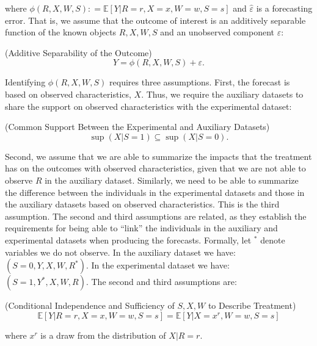\noindent where $\phi \left( R, X, W, S \right) : = \mathbb{E} \left[ Y | R = r, X = x, W = w, S = s \right] $ and $\widehat{\varepsilon}$ is a forecasting error. That is, we assume that the outcome of interest is an additively separable function of the known objects $R, X, W, S$ and an unobserved component $\varepsilon$: 

\begin{assumption} (Additive Separability of the Outcome) \label{ass:additive}
\begin{equation}
Y = \phi \left( R, X, W, S \right) + \varepsilon. 
\end{equation}
\end{assumption}

\noindent Identifying $\phi \left( R, X, W, S \right)$ requires three assumptions. First, the forecast is based on observed characteristics, $X$. Thus, we require the auxiliary datasets to share the support on observed characteristics with the experimental dataset: 

\begin{assumption} \label{ass:support} (Common Support Between the Experimental and Auxiliary Datasets)
\begin{equation}
\sup \left( X | S = 1 \right) \subseteq \sup \left( X | S = 0 \right).
\end{equation}
\end{assumption}

\noindent Second, we assume that we are able to summarize the impacts that the treatment has on the outcomes with observed characteristics, given that we are not able to observe $R$ in the auxiliary dataset. Similarly, we need to be able to summarize the difference between the individuals in the experimental datasets and those in the auxiliary datasets based on observed characteristics. This is the third assumption. The second and third  assumptions are related, as they establish the requirements for being able to ``link'' the individuals in the auxiliary and experimental datasets when producing the forecasts. Formally, let $^{*}$ denote variables we do not observe. In the auxiliary dataset we have: $\left( S = 0, Y, X, W, R^* \right)$. In the experimental dataset we have: $\left( S = 1, Y^*, X, W, R \right)$. The second and third assumptions are:  

\begin{assumption} (Conditional Independence and Sufficiency of $S, X, W$ to Describe Treatment)
\begin{equation}
\mathbb{E} \left[ Y | R = r, X = x, W = w, S = s\right] =  \mathbb{E} \left[ Y | X = x^r, W = w, S = s\right]
\end{equation}

\noindent where $x^r$ is a draw from the distribution of $X | R = r$. 
\end{assumption}

